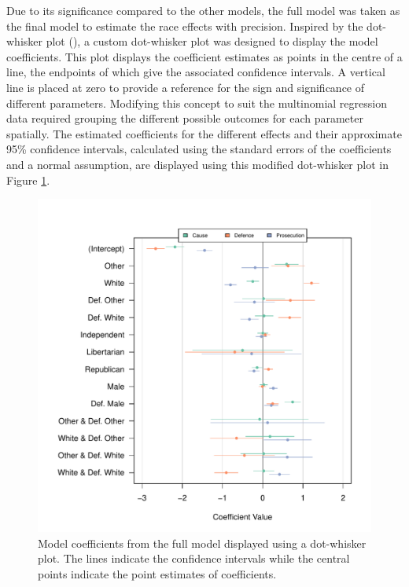 \documentclass[12pt]{article}
\begin{document}
Due to its significance compared to the other models, the full model was taken as the final model to estimate the race effects with precision. Inspired by the dot-whisker plot (\cite{dotwhisker}), a custom dot-whisker plot was designed to display the model coefficients. This plot displays the coefficient estimates as points in the centre of a line, the endpoints of which give the associated confidence intervals. A vertical line is placed at zero to provide a reference for the sign and significance of different parameters. Modifying this concept to suit the multinomial regression data required grouping the different possible outcomes for each parameter spatially. The estimated coefficients for the different effects and their approximate 95\% confidence intervals, calculated using the standard errors of the coefficients and a normal assumption, are displayed using this modified dot-whisker plot in Figure \ref{fig:modallcoef}.

\begin{figure}[h!]
  \centering
  \includegraphics[scale=0.7]{AllModCoef}
  \caption[All Model Coefficients]{\footnotesize Model coefficients from the full model displayed using
    a dot-whisker plot. The lines indicate the confidence intervals while the central points indicate the point estimates of
    coefficients.}
  \label{fig:modallcoef}
\end{figure}
\end{document}
